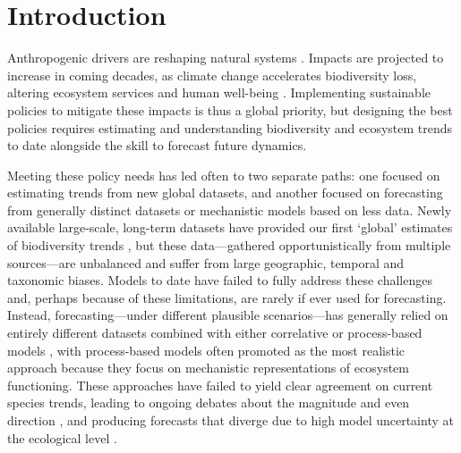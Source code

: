 \documentclass[11pt]{article}
\begin{document}

\section{Introduction}

Anthropogenic drivers are reshaping natural systems \citep{Diaz2019}. Impacts are projected to increase in coming decades, as climate change accelerates biodiversity loss, altering ecosystem services and human well-being \citep{IPBES2019}.
Implementing sustainable policies to mitigate these impacts is thus a global priority, but designing the best policies requires estimating and understanding biodiversity and ecosystem trends to date alongside the skill to forecast future dynamics. %

Meeting these policy needs has led often to two separate paths: one focused on estimating trends from new global datasets, and another focused on forecasting from generally distinct datasets or mechanistic models based on less data. Newly available large-scale, long-term datasets have provided our first `global' estimates of biodiversity trends \citep[e.g.][]{loh2005living,Dornelas2018}, but these data---gathered opportunistically from multiple sources---are unbalanced and suffer from large geographic, temporal and taxonomic biases. Models to date have failed to fully address these challenges and, perhaps because of these limitations, are rarely if ever used for forecasting.
Instead, forecasting---under different plausible scenarios---has generally relied on entirely different datasets combined with either correlative or process-based models \citep{IPBES2019}, with process-based models often promoted as the most realistic approach \citep{Urban2016, Pilowsky2022} because they focus on mechanistic representations of ecosystem functioning. These approaches have failed to yield clear agreement on current species trends, leading to ongoing debates about the magnitude and even direction \citep{Dornelas2014, Leung2020, Buschke2021, Johnson2024}, and producing forecasts that diverge due to high model uncertainty at the ecological level \citep{Cheaib2012, Thuiller2019}.
\end{document}
